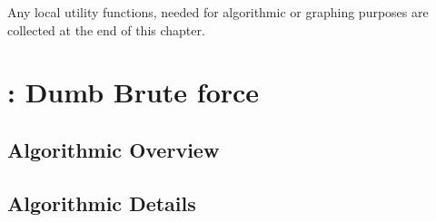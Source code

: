 \documentclass[11.5pt]{report}
\begin{document}
Any local utility functions, needed for algorithmic or graphing purposes 
are collected at the end of this chapter. 

\newpage

\section{: Dumb Brute force}

\subsection{Algorithmic Overview}

\subsection{Algorithmic Details}
\end{document}
